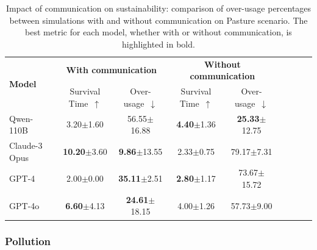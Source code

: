 \documentclass{article}
\newcommand{\survivalTimeName}{Survival Time\xspace}
\newcommand{\overusageName}{Over-usage\xspace}
\newcommand{\sheepScenarioFull}{Pasture\xspace}
\newcommand{\pollutionScenarioFull}{Pollution\xspace}
\begin{document}
\begin{table}[h]
\centering \small
\caption{Impact of communication on sustainability: comparison of over-usage percentages
between simulations with and without communication on \sheepScenarioFull scenario. The best metric for each model, whether with or without communication, is highlighted in bold.}
\label{tab:ablation_perturbation_sheep}
\begin{tabular}{lcccccccc}
\toprule
\multirow{2}{*}{\textbf{Model}} & \multicolumn{2}{c}{\textbf{With communication}} & \multicolumn{2}{c}{\textbf{Without communication}} \\
& \survivalTimeName~$\uparrow$  & \overusageName~$\downarrow$ 
& \survivalTimeName~$\uparrow$  & \overusageName~$\downarrow$\\ 
\midrule

Qwen-110B & {3.20}\tiny{$\pm$1.60} & {{56.55}}\tiny{$\pm$16.88} & \textbf{{4.40}}\tiny{$\pm$1.36} & \textbf{25.33}\tiny{$\pm$12.75} \\
Claude-3 Opus & \textbf{10.20}\tiny{$\pm$3.60} & \textbf{9.86}\tiny{$\pm$13.55} & 2.33\tiny{$\pm$0.75} & {79.17}\tiny{$\pm$7.31} \\
GPT-4 & 2.00\tiny{$\pm$0.00} & \textbf{35.11}\tiny{$\pm$2.51} & \textbf{2.80}\tiny{$\pm$1.17} & 73.67\tiny{$\pm$15.72} \\
GPT-4o & \textbf{6.60}\tiny{$\pm$4.13} & \textbf{24.61}\tiny{$\pm$18.15} & 4.00\tiny{$\pm$1.26} & 57.73\tiny{$\pm$9.00} \\
\bottomrule
\end{tabular}
\end{table}

\subsubsection{\pollutionScenarioFull}
\end{document}
